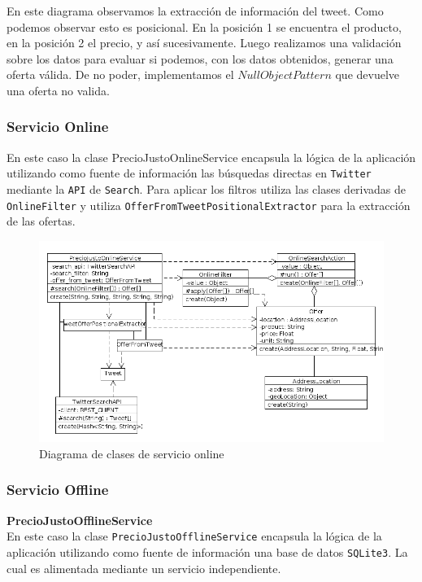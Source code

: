 En este diagrama observamos la extracci\'on de informaci\'on del tweet. Como podemos observar esto es posicional. En la posici\'on 1 se encuentra el producto, en la posici\'on 2 el precio, y as\'i sucesivamente.
Luego realizamos una validaci\'on sobre los datos para evaluar si podemos, con los datos obtenidos, generar una oferta v\'alida.
De no poder, implementamos el $NullObjectPattern$ que devuelve una oferta no valida.


\subsubsection{Servicio Online}
En este caso la clase PrecioJustoOnlineService encapsula la l\'ogica de la aplicaci\'on utilizando como fuente de informaci\'on las b\'usquedas directas en \texttt{Twitter} mediante la \texttt{API} de \texttt{Search}.
Para aplicar los filtros utiliza las clases derivadas de \texttt{OnlineFilter} y utiliza \texttt{OfferFromTweetPositionalExtractor} para la extracci\'on de las ofertas.

\begin{figure}[h]
\centerline{\includegraphics[width=0.9\paperwidth]{./imgs/class_diagram_online_service.png}}
\caption{Diagrama de clases de servicio online}
\label{fig:class_online_service}
\end{figure}

\subsubsection{Servicio Offline}

\textbf{PrecioJustoOfflineService}\\

En este caso la clase \texttt{PrecioJustoOfflineService} encapsula la l\'ogica de la aplicaci\'on utilizando como fuente de informaci\'on una base de datos \texttt{SQLite3}. La cual es alimentada mediante un servicio independiente.

